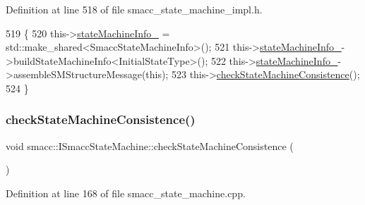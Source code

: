 Definition at line 518 of file smacc\+\_\+state\+\_\+machine\+\_\+impl.\+h.


\begin{DoxyCode}
519   \{
520     this->\hyperlink{classsmacc_1_1ISmaccStateMachine_a0914aa27c3f51374c338d89a32b135d1}{stateMachineInfo\_} = std::make\_shared<SmaccStateMachineInfo>();
521     this->\hyperlink{classsmacc_1_1ISmaccStateMachine_a0914aa27c3f51374c338d89a32b135d1}{stateMachineInfo\_}->buildStateMachineInfo<InitialStateType>();
522     this->\hyperlink{classsmacc_1_1ISmaccStateMachine_a0914aa27c3f51374c338d89a32b135d1}{stateMachineInfo\_}->assembleSMStructureMessage(\textcolor{keyword}{this});
523     this->\hyperlink{classsmacc_1_1ISmaccStateMachine_af34fa8346ae3f52882704422d59b9055}{checkStateMachineConsistence}();
524   \}
\end{DoxyCode}
\mbox{\label{classsmacc_1_1ISmaccStateMachine_af34fa8346ae3f52882704422d59b9055}} 
\subsubsection{\texorpdfstring{check\+State\+Machine\+Consistence()}{checkStateMachineConsistence()}}
{\footnotesize\ttfamily void smacc\+::\+I\+Smacc\+State\+Machine\+::check\+State\+Machine\+Consistence (\begin{DoxyParamCaption}{ }\end{DoxyParamCaption})\hspace{0.3cm}{\ttfamily [protected]}}



Definition at line 168 of file smacc\+\_\+state\+\_\+machine.\+cpp.


